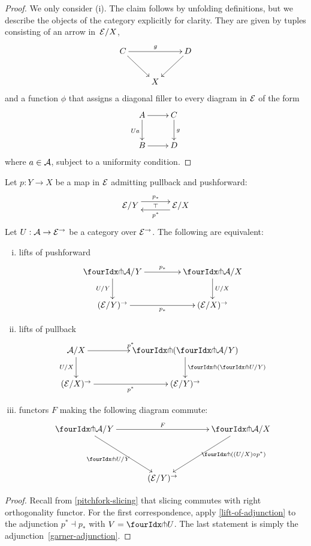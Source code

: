\documentclass[reqno,10pt,a4paper,oneside]{amsart}
\begin{document}
\begin{proof} We only consider (i). The claim follows by unfolding definitions, but we describe the objects of the category explicitly for clarity. They are given by 
tuples consisting of an arrow in~$\cal{E}/X$, 
\[
\xymatrix{
C \ar[dr] \ar[rr]^g  &  & D \ar[dl] \\
 & X & }
 \]
and a function $\phi$ that assigns a diagonal filler to every diagram in $\cal{E}$ of the form
\[
\xymatrix{
A \ar[r] \ar[d]_{Ua} & C \ar[d]^g \\
B \ar[r] & D}
\]
where $a \in \cal{A}$, subject to a uniformity condition. 
\end{proof}


\begin{corollary}
\label{lift-dependent-product}
Let $p : Y \to X$ be a map in $\catE$ admitting pullback and pushforward:
\[
\xymatrix@C+1em{
  \catE/Y
  \ar@<5pt>[r]^{p_*}
  \ar@{}[r]|{\top}
&
  \catE/X
  \ar@<5pt>[l]^{p^*}
}
\]
Let $U : \cal{A} \to \catE^{\to}$ be a category over $\catE^{\to}$. The following are
equivalent:
\begin{enumerate}[(i)]
\item lifts of pushforward
\[
\xymatrix@C=1.5cm{
\liftr{\cal{A}}/Y
\ar[r]^{p_*}
  \ar[d]_{U/Y}
&
  \liftr{\cal{A}}/X
  \ar[d]^{U/X}
\\
  (\catE/Y)^{\to}
   \ar[r]_{p_*}
&
  (\catE/X)^{\to}
 }
\]
\item lifts of pullback
\[
\xymatrix@C=1.5cm{
  \cal{A}/X
   \ar[r]^{p^*}
  \ar[d]_{U/X} 
  &
  \liftl{ ( \liftr{\cal{A}}/Y ) }
  \ar[d]^{\liftl{(\liftr{U}/Y)}}
     \\
     (\catE/X)^{\to} \ar[r]_{p^*} &
   (\catE/Y)^{\to} 
}
\]
\item functors $F$ making the following diagram commute:
\[
\xymatrix@C=1.2cm@R=1.5cm{
\liftr{\cal{A}}/Y \ar[rr]^F \ar[dr]_{\liftr{U}/Y} & &  \liftr{\cal{A}}/ X \ar[dl]^(.4){\ \liftr{( (U/X) \cc p^*)}}  \\
 & (\cal{E}/Y)^\to & }
\]
\end{enumerate}
\end{corollary}

\begin{proof}
Recall from \cref{pitchfork-slicing} that slicing commutes with right orthogonality functor.
For the first correspondence, apply \cref{lift-of-adjunction} to the adjunction $p^* \dashv p_*$ with  $V = \liftr{U}$.
The last statement is simply the adjunction~\eqref{garner-adjunction}.
\end{proof}
\end{document}
